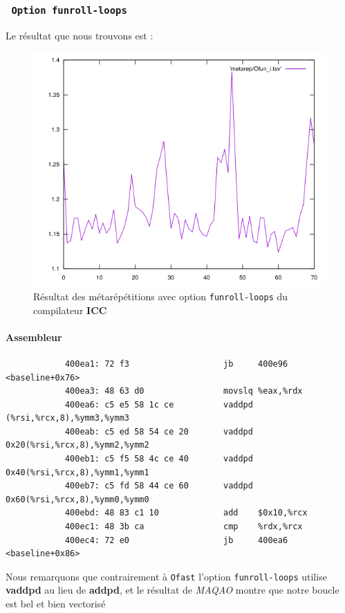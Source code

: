 \documentclass{report}
\begin{document}
      \subsubsection{\texttt{ Option funroll-loops}}
        Le résultat que nous trouvons est :
        \begin{figure}[ht!]
          \centering
          \includegraphics[scale=0.45]{resources/L1/metarep/Ofun_i.png}
          \caption{Résultat des métarépétitions avec option \texttt{funroll-loops} du compilateur \textbf{ICC}}
        \end{figure}
        \paragraph{Assembleur}
          \begin{verbatim}
            400ea1:	72 f3                	jb     400e96 <baseline+0x76>
            400ea3:	48 63 d0             	movslq %eax,%rdx
            400ea6:	c5 e5 58 1c ce       	vaddpd (%rsi,%rcx,8),%ymm3,%ymm3
            400eab:	c5 ed 58 54 ce 20    	vaddpd 0x20(%rsi,%rcx,8),%ymm2,%ymm2
            400eb1:	c5 f5 58 4c ce 40    	vaddpd 0x40(%rsi,%rcx,8),%ymm1,%ymm1
            400eb7:	c5 fd 58 44 ce 60    	vaddpd 0x60(%rsi,%rcx,8),%ymm0,%ymm0
            400ebd:	48 83 c1 10          	add    $0x10,%rcx
            400ec1:	48 3b ca             	cmp    %rdx,%rcx
            400ec4:	72 e0                	jb     400ea6 <baseline+0x86>
          \end{verbatim}
        Nous remarquons que contrairement à \texttt{Ofast} l'option \texttt{funroll-loops} utilise \textbf{vaddpd}
        au lieu de \textbf{addpd}, et le résultat de \textit{MAQAO} montre que notre boucle est bel et bien vectorisé
\end{document}
